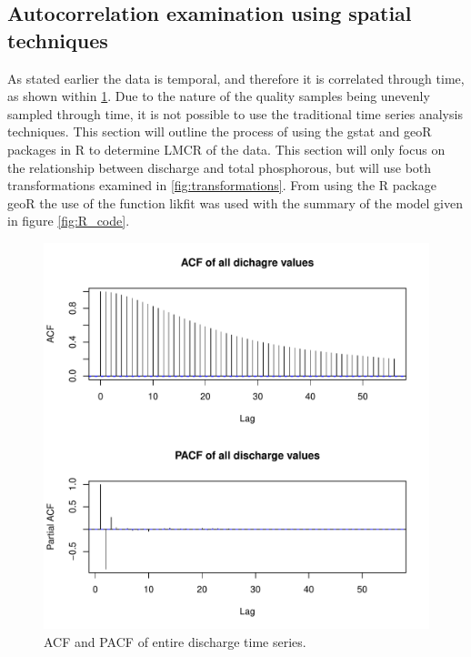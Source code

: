 \documentclass[5p]{elsarticle}
\begin{document}
\subsection*{Autocorrelation examination using spatial techniques}
As stated earlier the data is temporal, and therefore it is correlated through time, as shown within \ref{fig:acf_pacf}. Due to the nature of the quality samples being unevenly sampled through time, it is not possible to use the traditional time series analysis techniques. This section will outline the process of using the gstat and geoR packages in R to determine LMCR of the data. This section will only focus on the relationship between discharge and total phosphorous, but will use both transformations examined in \ref{fig:transformations}.
From using the R package geoR the use of the function likfit was used with the summary of the model given in figure \ref{fig:R_code}.

\begin{center}
\begin{figure}
\includegraphics[scale=0.5]{acf_pacf.pdf}
\caption{ACF and PACF of entire discharge time series.}
\label{fig:acf_pacf}
\end{figure}
\end{center}
\end{document}
